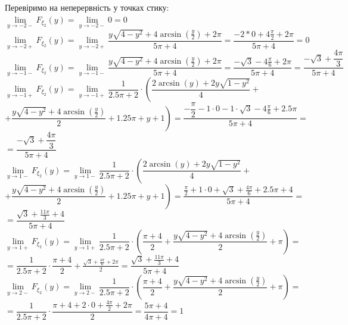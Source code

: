 \documentclass[14pt,a4paper]{scrartcl}
\theoremstyle{definition}
\theoremstyle{remark}
\theoremstyle{definition}
\theoremstyle{definition}
\begin{document}
Перевіримо на неперервність у точках стику:\\
$
 \lim\limits_{y\to  -2-}{ F_{\xi_2}(y)} =  \lim\limits_{y\to  -2-}{0} = 0
$\\
$
 \lim\limits_{y\to  -2+}{ F_{\xi_2}(y)} =  \lim\limits_{y\to  -2+}{\dfrac{y\sqrt{4-y^2}+4\arcsin\left(\frac{y}{2}\right) + 2\pi}{5\pi + 4}} = \dfrac{
 -2*0+4 \frac{\pi}{2} +2{\pi}
 }{ 5\pi + 4}= 0
$\\
$
 \lim\limits_{y\to  -1-}{ F_{\xi_2}(y)} =  \lim\limits_{y\to  -1-}{\dfrac{y\sqrt{4-y^2}+4\arcsin\left(\frac{y}{2}\right) + 2\pi}{5\pi + 4}} = \dfrac{
 -\sqrt{3}-4 \frac{\pi}{6} +2{\pi}
 }{ 5\pi + 4} = \dfrac{-\sqrt{3} + \dfrac{4\pi}{3} }{5\pi + 4}
$\\
$
 \lim\limits_{y\to  -1+}{ F_{\xi_2}(y)} =  \lim\limits_{y\to  -1+}{\dfrac{1}{2.5\pi +
 2} \cdot \left( \dfrac{2\arcsin\left(y\right)+2y\sqrt{1-y^2}}{4} \right.}+$\\$+ \left. \dfrac{y\sqrt{4-y^2}+4\arcsin\left(\frac{y}{2}\right)}{2}+1.25{\pi} + y + 1 \right)  = \dfrac{- \dfrac{\pi}{2} -1 \cdot 0 - 	1\cdot \sqrt{3} - 4  \frac{\pi}{6} + 2.5\pi}{5\pi + 4}  =$\\$ = \dfrac{-\sqrt{3} + \dfrac{4\pi}{3} }{5\pi + 4}
$\\
$
\lim\limits_{y\to  1-}{ F_{\xi_2}(y)} =  \lim\limits_{y\to  1-}{\dfrac{1}{2.5\pi +
2} \cdot \left( \dfrac{2\arcsin\left(y\right)+2y\sqrt{1-y^2}}{4} \right.}+$\\$+ \left. \dfrac{y\sqrt{4-y^2}+4\arcsin\left(\frac{y}{2}\right)}{2}+1.25{\pi} + y + 1 \right)  = \dfrac{ \frac{\pi}{2} + 1\cdot 0 + \sqrt{3} + \frac{4\pi}{6} + 2.5\pi + 4  }{5\pi + 4} =
$\\
$
= \dfrac{ \sqrt{3} + \frac{11\pi}{3}  + 4  }{5\pi + 4}
$\\
$
\lim\limits_{y\to  1+ }{ F_{\xi_2}(y)} =  \lim\limits_{y\to 1+}{ \dfrac{1}{2.5\pi + 2} \cdot \left( \dfrac{{\pi}+4}{2} + \dfrac{y\sqrt{4-y^2}+4\arcsin\left(\frac{y}{2}\right)}{2}+{\pi} \right) } =
$\\
$
=\dfrac{1}{2.5\pi + 2} \cdot \dfrac{ \pi + 4}{ 2} + \frac{\sqrt{3} + \frac{4\pi}{6}  + 2\pi}{2} = \dfrac{ \sqrt{3} + \frac{11\pi}{3}  + 4  }{5\pi + 4}
$\\
$
\lim\limits_{y\to  2-}{ F_{\xi_2}(y)} =  \lim\limits_{y\to 2-}{ \dfrac{1}{2.5\pi + 2} \cdot \left( \dfrac{{\pi}+4}{2} + \dfrac{y\sqrt{4-y^2}+4\arcsin\left(\frac{y}{2}\right)}{2}+{\pi} \right) } =
$
$
= \dfrac{1}{2.5\pi + 2} \cdot\dfrac{\pi + 4 + 2\cdot 0 + \frac{4\pi}{2} + 2\pi }{2} = \dfrac{5\pi + 4}{4\pi + 4} = 1
$\\
\end{document}
